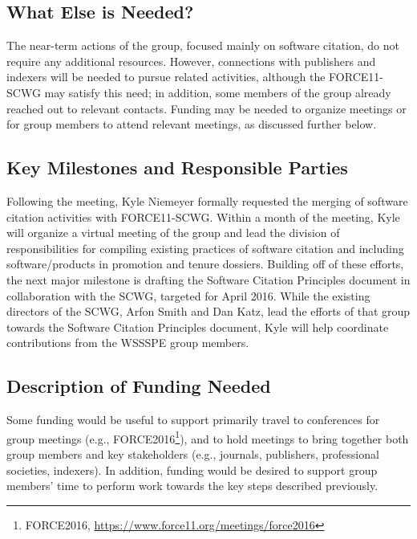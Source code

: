 \subsection{What Else is Needed?}

The near-term actions of the group, focused mainly on software citation, do not require any additional resources.
However, connections with publishers and indexers will be needed to pursue related activities, although the FORCE11-SCWG may satisfy this need; in addition, some members of the group already reached out to relevant contacts.
Funding may be needed to organize meetings or for group members to attend relevant meetings, as discussed further below.

\subsection{Key Milestones and Responsible Parties}

Following the meeting, Kyle Niemeyer formally requested the merging of software citation activities with FORCE11-SCWG.
Within a month of the meeting, Kyle will organize a virtual meeting of the group and lead the division of responsibilities for compiling existing practices of software citation and including software\slash products in promotion and tenure dossiers.
Building off of these efforts, the next major milestone is drafting the Software Citation Principles document in collaboration with the SCWG, targeted for April 2016.
While the existing directors of the SCWG, Arfon Smith and Dan Katz, lead the efforts of that group towards the Software Citation Principles document, Kyle will help coordinate contributions from the WSSSPE group members.


\subsection{Description of Funding Needed}

Some funding would be useful to support primarily travel to conferences for group meetings (e.g., FORCE2016\footnote{FORCE2016, \url{https://www.force11.org/meetings/force2016}}), and to hold meetings to bring together both group members and key stakeholders (e.g., journals, publishers, professional societies, indexers).
In addition, funding would be desired to support group members' time to perform work towards the key steps described previously.
